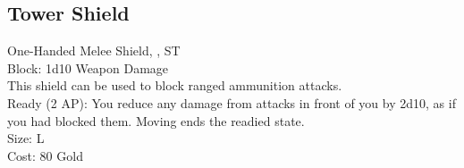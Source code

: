 \subsection{Tower Shield}\label{weapon:towerShield}
One-Handed Melee Shield, , ST\\
Block: 1d10 Weapon Damage\\
This shield can be used to block ranged ammunition attacks.\\
Ready (2 AP): You reduce any damage from attacks in front of you by 2d10, as if you had blocked them.
Moving ends the readied state.\\
Size: L\\
Cost: 80 Gold\\
